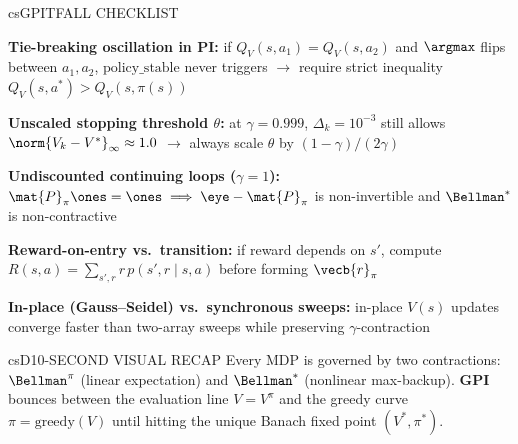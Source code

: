 \documentclass[../../../../master.tex]{subfiles}
\begin{document}
\begin{cscolumns}
\begin{cscard}{csG}{PITFALL CHECKLIST}
  \begin{csbul}
    \item \textbf{Tie-breaking oscillation in PI:} if $Q_V(s,a_1)=Q_V(s,a_2)$ and $\argmax$ flips between $a_1,a_2$, $\text{policy\_stable}$ never triggers $\to$ require strict inequality $Q_V(s,a^*) > Q_V(s,\pi(s))$
    \item \textbf{Unscaled stopping threshold $\theta$:} at $\gamma=0.999$, $\Delta_k = 10^{-3}$ still allows $\norm{V_k-V^*}_\infty \approx 1.0$ $\to$ always scale $\theta$ by $(1-\gamma)/(2\gamma)$
    \item \textbf{Undiscounted continuing loops ($\gamma=1$):} $\mat{P}_\pi\ones=\ones \implies \eye-\mat{P}_\pi$ is non-invertible and $\Bellman^*$ is non-contractive
    \item \textbf{Reward-on-entry vs.\ transition:} if reward depends on $s'$, compute $R(s,a) = \sum_{s',r} r\,p(s',r\mid s,a)$ before forming $\vecb{r}_\pi$
    \item \textbf{In-place (Gauss--Seidel) vs.\ synchronous sweeps:} in-place $V(s)$ updates converge faster than two-array sweeps while preserving $\gamma$-contraction
  \end{csbul}
\end{cscard}

\begin{cscard}{csD}{10-SECOND VISUAL RECAP}
  \sffamily\footnotesize
  Every MDP is governed by two contractions: \textbf{$\Bellman^\pi$} (linear expectation) and \textbf{$\Bellman^*$} (nonlinear max-backup).
  \textbf{GPI} bounces between the evaluation line $V=V^\pi$ and the greedy curve $\pi=\mathrm{greedy}(V)$ until hitting the unique Banach fixed point $(V^*,\pi^*)$.
\end{cscard}
\end{cscolumns}

\csend
\end{document}
